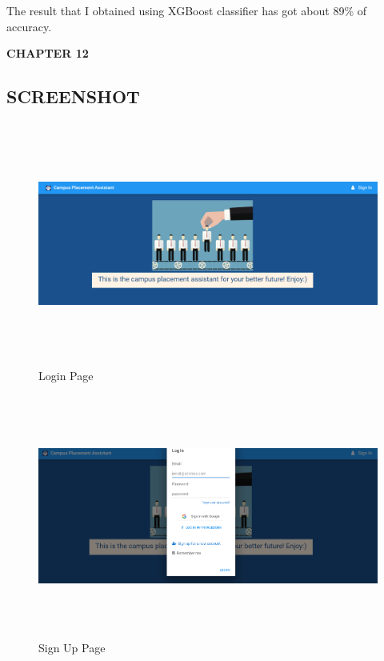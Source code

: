 \documentclass[12pt]{article}
\begin{document}
The result that I obtained using XGBoost classifier has got about 89\% of accuracy.
\newpage
\begin{flushleft}\textbf{CHAPTER 12} \end{flushleft}
\begin{flushleft}\section{SCREENSHOT} \end{flushleft}

\begin{figure}[H]
\begin{center}
 \includegraphics[width=16cm, height=8cm]{Screenshot1}
\caption{Login Page }
\end{center}
\end{figure}

\begin{figure}[H]
\begin{center}
 \includegraphics[width=16cm, height=8cm]{Screenshot2}
\caption{Sign Up Page}
\end{center}
\end{figure}
\end{document}
